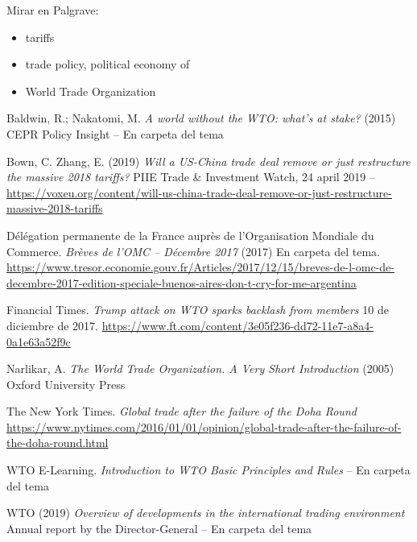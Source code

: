 \documentclass{nuevotema}
\begin{document}
\bibliografia
Mirar en Palgrave:
\begin{itemize}
	\item tariffs
	\item trade policy, political economy of
	\item World Trade Organization
\end{itemize}

Baldwin, R.; Nakatomi, M. \textit{A world without the WTO: what’s at stake?} (2015) CEPR Policy Insight -- En carpeta del tema 

Bown, C. Zhang, E. (2019) \textit{Will a US-China trade deal remove or just restructure the massive 2018 tariffs?} PIIE Trade \& Investment Watch, 24 april 2019 -- \url{https://voxeu.org/content/will-us-china-trade-deal-remove-or-just-restructure-massive-2018-tariffs}

Délégation permanente de la France auprès de l’Organisation Mondiale du Commerce. \textit{Brèves de l’OMC – Décembre 2017} (2017) En carpeta del tema. \url{https://www.tresor.economie.gouv.fr/Articles/2017/12/15/breves-de-l-omc-de-decembre-2017-edition-speciale-buenos-aires-don-t-cry-for-me-argentina}

Financial Times. \textit{Trump attack on WTO sparks backlash from members} 10 de diciembre de 2017. \url{https://www.ft.com/content/3e05f236-dd72-11e7-a8a4-0a1e63a52f9c}

Narlikar, A. \textit{The World Trade Organization. A Very Short Introduction} (2005) Oxford University Press

The New York Times. \textit{Global trade after the failure of the Doha Round} \url{https://www.nytimes.com/2016/01/01/opinion/global-trade-after-the-failure-of-the-doha-round.html}


WTO E-Learning. \textit{Introduction to WTO Basic Principles and Rules} -- En carpeta del tema

WTO (2019) \textit{Overview of developments in the international trading environment} Annual report by the Director-General -- En carpeta del tema
\end{document}
